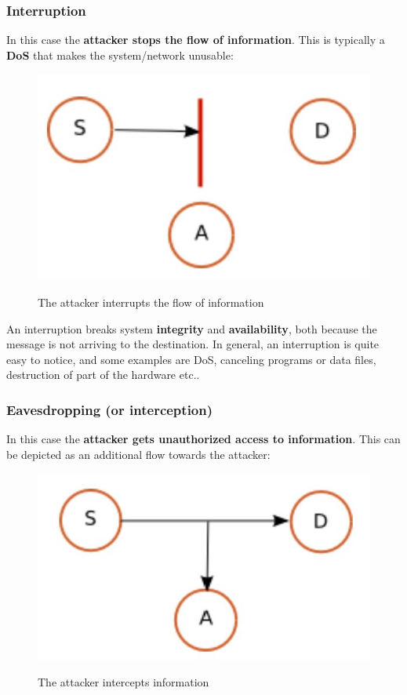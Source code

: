 \subsubsection{Interruption}
In this case the \textbf{attacker stops the flow of information}. This is typically a \textbf{DoS} that makes the system/network unusable:

\begin{figure}[h!]
    \centering
    \includegraphics[scale = 0.7]{img/sec5.jpg}
    \label{sec5}
    \caption{The attacker interrupts the flow of information}
\end{figure}

An interruption breaks system \textbf{integrity} and \textbf{availability}, both because the message is not arriving to the destination. In general, an interruption is quite easy to notice, and some examples are DoS, canceling programs or data files, destruction of part of the hardware etc..

\subsubsection{Eavesdropping (or interception)}
In this case the \textbf{attacker gets unauthorized access to information}. This can be depicted as an additional flow towards the attacker:

\begin{figure}[h!]
    \centering
    \includegraphics[scale = 0.7]{img/sec2.jpg}
    \label{sec2}
    \caption{The attacker intercepts information}
\end{figure}

